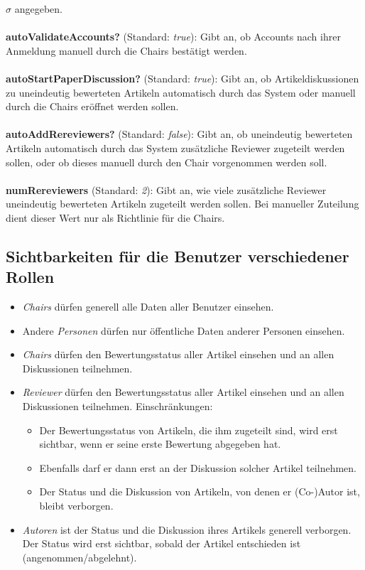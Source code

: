 \documentclass[headexclude,footexclude,12pt,BCOR0pt,DIV15]{scrartcl}
\begin{document}
            $\sigma$ angegeben.
        \\
        \\
        \textbf{autoValidateAccounts?} (Standard: \textit{true}): Gibt an, ob Accounts nach ihrer Anmeldung manuell durch
            die Chairs best\"{a}tigt werden.
        \\
        \\
        \textbf{autoStartPaperDiscussion?} (Standard: \textit{true}): Gibt an, ob Artikeldiskussionen zu uneindeutig bewerteten
            Artikeln automatisch durch das System oder manuell durch die Chairs er\"{o}ffnet werden sollen.
        \\
        \\
        \textbf{autoAddRereviewers?} (Standard: \textit{false}): Gibt an, ob uneindeutig bewerteten Artikeln automatisch durch
            das System zus\"{a}tzliche Reviewer zugeteilt werden sollen, oder ob dieses manuell durch den Chair vorgenommen werden soll.
        \\
        \\
        \textbf{numRereviewers} (Standard: \textit{2}): Gibt an, wie viele zus\"{a}tzliche Reviewer uneindeutig bewerteten Artikeln
            zugeteilt werden sollen. Bei manueller Zuteilung dient dieser Wert nur als Richtlinie f\"{u}r die Chairs.

    \subsection{Sichtbarkeiten f\"{u}r die Benutzer verschiedener Rollen}

        \begin{itemize}
            \item \emph{Chairs} d\"{u}rfen generell alle Daten aller Benutzer einsehen.
            \item Andere \emph{Personen} d\"{u}rfen nur \"{o}ffentliche Daten anderer Personen einsehen.
            \item \emph{Chairs} d\"{u}rfen den Bewertungsstatus aller Artikel einsehen und an allen Diskussionen teilnehmen.
            \item \emph{Reviewer} d\"{u}rfen den Bewertungsstatus aller Artikel einsehen und an allen Diskussionen teilnehmen.
                  Einschr\"{a}nkungen:
                  \begin{itemize}
                  \item Der Bewertungsstatus von Artikeln, die ihm zugeteilt sind, wird erst sichtbar, wenn er seine
                        erste Bewertung abgegeben hat.
                  \item Ebenfalls darf er dann erst an der Diskussion solcher Artikel teilnehmen.
                  \item Der Status und die Diskussion von Artikeln, von denen er (Co-)Autor ist, bleibt verborgen.
                  \end{itemize}
            \item \emph{Autoren} ist der Status und die Diskussion ihres Artikels generell verborgen. Der Status wird erst
                  sichtbar, sobald der Artikel entschieden ist (angenommen/abgelehnt).
        \end{itemize}
\end{document}
